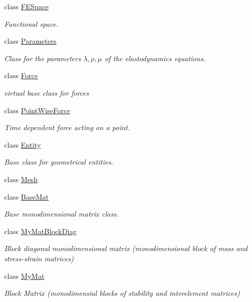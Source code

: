 \begin{DoxyCompactItemize}
\item 
class \hyperlink{classTspeed_1_1FESpace}{F\-E\-Space}
\begin{DoxyCompactList}\small\item\em Functional space. \end{DoxyCompactList}\item 
class \hyperlink{classTspeed_1_1Parameters}{Parameters}
\begin{DoxyCompactList}\small\item\em Class for the parameters $\lambda, \rho, \mu$ of the elastodynamics equations. \end{DoxyCompactList}\item 
class \hyperlink{classTspeed_1_1Force}{Force}
\begin{DoxyCompactList}\small\item\em virtual base class for forces \end{DoxyCompactList}\item 
class \hyperlink{classTspeed_1_1PointWiseForce}{Point\-Wise\-Force}
\begin{DoxyCompactList}\small\item\em Time dependent force acting on a point. \end{DoxyCompactList}\item 
class \hyperlink{classTspeed_1_1Entity}{Entity}
\begin{DoxyCompactList}\small\item\em Base class for geometrical entities. \end{DoxyCompactList}\item 
class \hyperlink{classTspeed_1_1Mesh}{Mesh}
\item 
class \hyperlink{classTspeed_1_1BaseMat}{Base\-Mat}
\begin{DoxyCompactList}\small\item\em Base monodimensional matrix class. \end{DoxyCompactList}\item 
class \hyperlink{classTspeed_1_1MyMatBlockDiag}{My\-Mat\-Block\-Diag}
\begin{DoxyCompactList}\small\item\em Block diagonal monodimensional matrix (monodimensional block of mass and stress-\/strain matrices) \end{DoxyCompactList}\item 
class \hyperlink{classTspeed_1_1MyMat}{My\-Mat}
\begin{DoxyCompactList}\small\item\em Block Matrix (monodimensial blocks of stability and interelement matrices) \end{DoxyCompactList}\item 

\end{DoxyCompactItemize}
